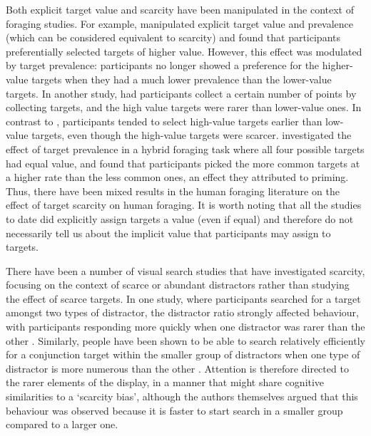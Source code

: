 \documentclass[12pt]{article}
\begin{document}
Both explicit target value and scarcity have been manipulated in the context of foraging studies. For example, \cite{wiegand2021target} manipulated explicit target value and prevalence (which can be considered equivalent to scarcity) and found that participants preferentially selected targets of higher value. However, this effect was modulated by target prevalence: participants no longer showed a preference for the higher-value targets when they had a much lower prevalence than the lower-value targets. In another study, \cite{tagu2022selection}  had participants collect a certain number of points by collecting targets, and the high value targets were rarer than lower-value ones. In contrast to \cite{wiegand2021target}, participants tended to select high-value targets earlier than low-value targets, even though the high-value targets were scarcer. \cite{wolfe2018hybrid} investigated the effect of target prevalence in a hybrid foraging task where all four possible targets had equal value, and found that participants picked the more common targets at a higher rate than the less common ones, an effect they attributed to priming. Thus, there have been mixed results in the human foraging literature on the effect of target scarcity on human foraging. It is worth noting that all the studies to date did explicitly assign targets a value (even if equal) and therefore do not necessarily tell us about the implicit value that participants may assign to targets.

There have been a number of visual search studies that have investigated scarcity, focusing on the context of scarce or abundant distractors rather than studying the effect of scarce targets. In one study, where participants searched for a target amongst two types of distractor, the distractor ratio strongly affected behaviour, with participants responding more quickly when one distractor was rarer than the other \citep{shen2000distractor}. Similarly, people have been shown to be able to search relatively efficiently for a conjunction target within the smaller group of distractors when one type of distractor is more numerous than the other \citep{sobel2002roles}. Attention is therefore directed to the rarer elements of the display, in a manner that might share cognitive similarities to a `scarcity bias', although the authors themselves argued that this behaviour was observed because it is faster to start search in a smaller group compared to a larger one.
\end{document}
